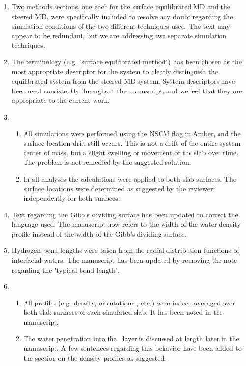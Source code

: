 \documentclass{article}
\begin{document}
\begin{enumerate}
\item Two methods sections, one each for the surface equilibrated MD and the steered MD, were specifically included to resolve any doubt regarding the simulation conditions of the two different techniques used. The text may appear to be redundant, but we are addressing two separate simulation techniques.

\item The terminology (e.g. "surface equilibrated method") has been chosen as the most appropriate descriptor for the system to clearly distinguish the equilibrated system from the steered MD system. System descriptors have been used consistently throughout the manuscript, and we feel that they are appropriate to the current work.

\item 
\begin{enumerate}
\item All simulations were performed using the NSCM flag in Amber, and the surface location drift still occurs. This is not a drift of the entire system center of mass, but a slight swelling or movement of the slab over time. The problem is not remedied by the suggested solution.

\item In all analyses the calculations were applied to both slab surfaces. The surface locations were determined as suggested by the reviewer: independently for both surfaces.
\end{enumerate}

\item Text regarding the Gibb's dividing surface has been updated to correct the language used. The manuscript now refers to the width of the water density profile instead of the width of the Gibb's dividing surface.

\item Hydrogen bond lengths were taken from the radial distribution functions of interfacial waters. The manuscript has been updated by removing the note regarding the "typical bond length".

\item 
\begin{enumerate}
\item All profiles (e.g. density, orientational, etc.) were indeed averaged over both slab surfaces of each simulated slab. It has been noted in the manuscript.

\item The water penetration into the \suldiox~layer is discussed at length later in the manuscript. A few sentences regarding this behavior have been added to the section on the density profiles as suggested.
\end{enumerate}


\end{enumerate}
\end{document}
